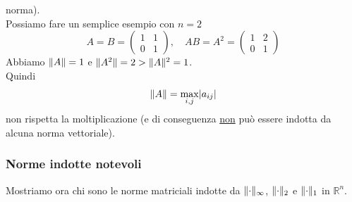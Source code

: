 norma). \\
Possiamo fare un semplice esempio con $n = 2$
\[A = B = \begin{pmatrix}
    1 & 1 \\
    0 & 1
\end{pmatrix}, \quad AB = A^2 =
\begin{pmatrix}
    1 & 2 \\
    0 & 1
\end{pmatrix}\]
Abbiamo $\lVert A\rVert = 1$ e $\lVert A^2\rVert = 2 > \lVert A\rVert^2 = 1$.\\
Quindi 
\[\lVert A\rVert = \max_{i,j} \lvert a_{ij}\rvert\]
non rispetta la moltiplicazione (e di conseguenza \uline{non} può essere indotta da alcuna norma vettoriale).

\subsubsection{Norme indotte notevoli}
Mostriamo ora chi sono le norme matriciali indotte da
$\lVert\cdot\rVert_{\infty}$, $\lVert\cdot\rVert_2$ e $\lVert\cdot\rVert_1$ in $\mathbb{R}^n$.\\
